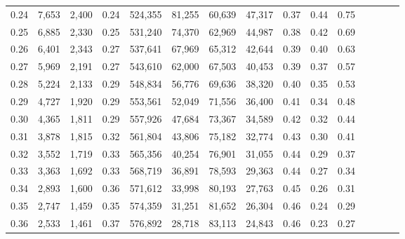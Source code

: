 \begin{tabular}{rrrcrrrrrrrrrrr}
0.24 &   7,653 &  2,400 &                                       0.24 &  524,355 &   81,255 &   60,639 &   47,317 &  0.37 &  0.44 &                         0.75 \\
0.25 &   6,885 &  2,330 &                                       0.25 &  531,240 &   74,370 &   62,969 &   44,987 &  0.38 &  0.42 &                         0.69 \\
0.26 &   6,401 &  2,343 &                                       0.27 &  537,641 &   67,969 &   65,312 &   42,644 &  0.39 &  0.40 &                         0.63 \\
0.27 &   5,969 &  2,191 &                                       0.27 &  543,610 &   62,000 &   67,503 &   40,453 &  0.39 &  0.37 &                         0.57 \\
0.28 &   5,224 &  2,133 &                                       0.29 &  548,834 &   56,776 &   69,636 &   38,320 &  0.40 &  0.35 &                         0.53 \\
0.29 &   4,727 &  1,920 &                                       0.29 &  553,561 &   52,049 &   71,556 &   36,400 &  0.41 &  0.34 &                         0.48 \\
0.30 &   4,365 &  1,811 &                                       0.29 &  557,926 &   47,684 &   73,367 &   34,589 &  0.42 &  0.32 &                         0.44 \\
0.31 &   3,878 &  1,815 &                                       0.32 &  561,804 &   43,806 &   75,182 &   32,774 &  0.43 &  0.30 &                         0.41 \\
0.32 &   3,552 &  1,719 &                                       0.33 &  565,356 &   40,254 &   76,901 &   31,055 &  0.44 &  0.29 &                         0.37 \\
0.33 &   3,363 &  1,692 &                                       0.33 &  568,719 &   36,891 &   78,593 &   29,363 &  0.44 &  0.27 &                         0.34 \\
0.34 &   2,893 &  1,600 &                                       0.36 &  571,612 &   33,998 &   80,193 &   27,763 &  0.45 &  0.26 &                         0.31 \\
0.35 &   2,747 &  1,459 &                                       0.35 &  574,359 &   31,251 &   81,652 &   26,304 &  0.46 &  0.24 &                         0.29 \\
0.36 &   2,533 &  1,461 &                                       0.37 &  576,892 &   28,718 &   83,113 &   24,843 &  0.46 &  0.23 &                         0.27 \\

\end{tabular}
